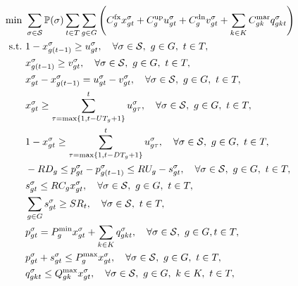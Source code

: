 \begin{subequations}
	\begin{align}
	\min \ & \sum_{\sigma \in \mathcal{S}} \PP(\sigma) \sum_{t\in T} \sum_{g\in G}\left( C^\text{fx}_g x_{gt}^\sigma + C^\text{up}_g u_{gt}^\sigma  + C^\text{dn}_g v_{gt}^\sigma  + \sum_{k\in K} C^\text{mar}_{gk} q_{gkt}^\sigma\right) \label{eq:suc:obj}\\
	\text{s.t.} \
	& 1 - x_{g(t-1)}^\sigma \geq u_{gt}^\sigma , \quad \forall \sigma \in \mathcal{S},\ g\in G,\ t\in T, \label{eq:suc:cons1} \\
	& x_{g(t-1)}^\sigma \geq v_{gt}^\sigma , \quad \forall \sigma \in \mathcal{S},\ g\in G,\ t\in T, \label{eq:suc:cons2} \\
	& x_{gt}^\sigma - x_{g(t-1)}^\sigma = u_{gt}^\sigma  - v_{gt}^\sigma , \quad \forall \sigma \in \mathcal{S},\ g\in G,\ t\in T, \label{eq:suc:cons3} \\
	& x_{gt}^\sigma \geq \sum_{\tau=\max\{1,t-UT_g+1\}}^t u_{g\tau}^\sigma, \quad \forall \sigma \in \mathcal{S},\ g\in G,\ t\in T, \label{eq:suc:cons4} \\
	& 1 - x_{gt}^\sigma \geq \sum_{\tau=\max\{1,t-DT_g+1\}}^t u_{g\tau}^\sigma,\quad \forall \sigma \in \mathcal{S},\ g\in G,\ t\in T, \label{eq:suc:cons5} \\
	& -RD_g \leq p_{gt}^\sigma - p_{g(t-1)}^\sigma \leq RU_g - s_{gt}^\sigma, \quad \forall \sigma \in \mathcal{S},\ g\in G,\ t\in T, \label{eq:suc:cons6} \\
	& s_{gt}^\sigma \leq RC_g x_{gt}^\sigma, \quad \forall \sigma \in \mathcal{S},\ g\in G,\ t\in T, \label{eq:suc:cons7} \\
	& \sum_{g\in G} s_{gt}^\sigma \geq SR_t, \quad \forall \sigma \in \mathcal{S},\ t\in T,\ \label{eq:suc:cons8} \\
	& p_{gt}^\sigma = P^\text{min}_g x_{gt}^\sigma + \sum_{k\in K} q_{gkt}^\sigma, \quad \forall \sigma \in \mathcal{S},\ g\in G, t\in T,\ \label{eq:suc:cons9} \\
	& p_{gt}^\sigma + s_{gt}^\sigma \leq P^\text{max}_g x_{gt}^\sigma, \quad \forall \sigma \in \mathcal{S},\ g\in G,\ t\in T, \label{eq:suc:cons10} \\
	& q_{gkt}^\sigma \leq Q^\text{max}_{gk} x_{gt}^\sigma, \quad \forall \sigma \in \mathcal{S},\ g\in G,\ k\in K,\ t\in T, \label{eq:suc:cons11} \\

\end{align}
\end{subequations}
